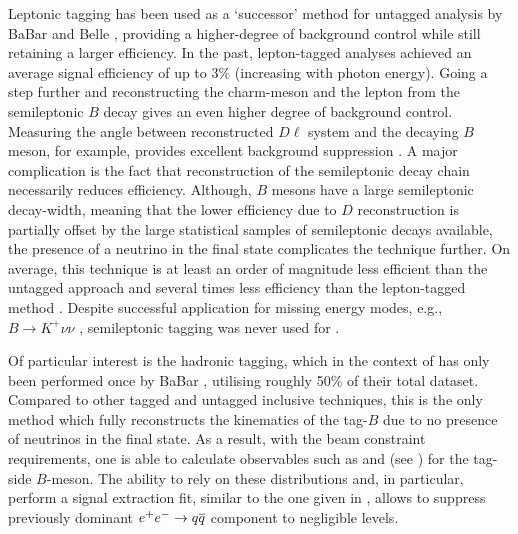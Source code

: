 Leptonic tagging has been used as a `successor' method for \BtoXsgamma untagged analysis by BaBar and Belle \cite{Belle:2009nth,BaBar:2012fqh,Belle:2016ufb}, providing a higher-degree of background control while still retaining a larger efficiency.
In the past, lepton-tagged analyses achieved an average signal efficiency of up to $3\%$ (increasing with photon energy).
Going a step further and reconstructing the charm-meson and the lepton from the semileptonic $B$ decay gives an even higher degree of background control.
Measuring the angle between reconstructed $D\ell$ system and the decaying $B$ meson, for example, provides excellent background suppression \cite{BaBar:2014omp}.
A major complication is the fact that reconstruction of the semileptonic decay chain necessarily reduces efficiency.
Although, $B$ mesons have a large semileptonic decay-width, meaning that the lower efficiency due to $D$ reconstruction is partially offset by the large statistical samples of semileptonic decays available,
the presence of a neutrino in the final state complicates the technique further.
On average, this technique is at least an order of magnitude less efficient than the untagged approach and several times less efficiency than the lepton-tagged method \cite{Belle-II:2018jsg}.
Despite successful application for missing energy modes, e.g., $B\rightarrow K^+\nu\nu$ \cite{BaBar:2009qvi}, semileptonic tagging was never used for \BtoXsgamma.


Of particular interest is the hadronic tagging, which in the context of \BtoXsgamma has only been performed once by BaBar \cite{BaBar:2007yhb}, utilising roughly 50\% of their total dataset.
Compared to other tagged and untagged inclusive techniques, this is the only method which fully reconstructs the kinematics of the tag-$B$ due to no presence of neutrinos in the final state.
As a result, with the beam constraint requirements, one is able to calculate observables such as \Mbc and \DeltaE (see ) for the tag-side $B$-meson.
The ability to rely on these distributions and, in particular, perform a signal extraction fit, similar to the one given in , allows to suppress previously dominant $e^+e^-\rightarrow q\overline q$ component to negligible levels.

